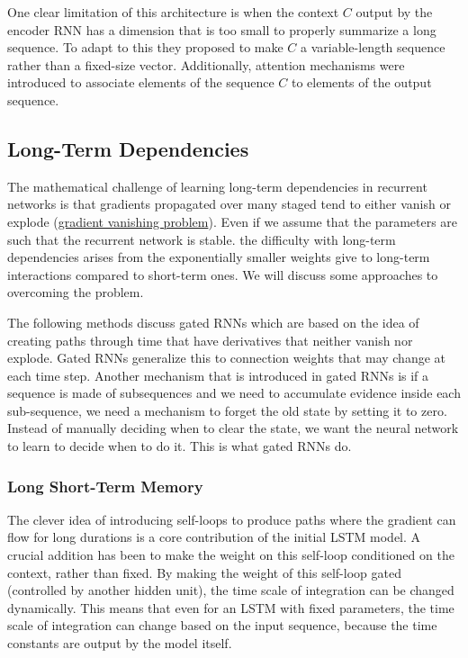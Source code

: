 \documentclass[12pt]{article}
\begin{document}
        One clear limitation of this architecture is when the context $C$ output by the encoder RNN has a dimension that
        is too small to properly summarize a long sequence. To adapt to this they proposed to make $C$ a
        variable-length sequence rather than a fixed-size vector. Additionally, attention mechanisms were introduced to
        associate elements of the sequence $C$ to elements of the output sequence.
    
    \subsection{Long-Term Dependencies}
        The mathematical challenge of learning long-term dependencies in recurrent networks is that gradients propagated
        over many staged tend to either vanish or explode (\hyperref[sec:VanishingProblem]{gradient vanishing problem}).
        Even if we assume that the parameters are such that the recurrent network is stable. the difficulty with
        long-term dependencies arises from the exponentially smaller weights give to long-term interactions compared to
        short-term ones. We will discuss some approaches to overcoming the problem. 
        
        The following methods discuss gated RNNs which are based on the idea of creating paths through time that have
        derivatives that neither vanish nor explode. Gated RNNs generalize this to connection weights that may change at
        each time step. Another mechanism that is introduced in gated RNNs is if a sequence is made of subsequences and
        we need to accumulate evidence inside each sub-sequence, we need a mechanism to forget the old state by setting
        it to zero. Instead of manually deciding when to clear the state, we want the neural network to learn to decide
        when to do it. This is what gated RNNs do. 

        \subsubsection{Long Short-Term Memory} \label{sec:LSTM}
            The clever idea of introducing self-loops to produce paths where the gradient can flow for long durations is
            a core contribution of the initial LSTM model. A crucial addition has been to make the weight on this
            self-loop conditioned on the context, rather than fixed. By making the weight of this self-loop gated
            (controlled by another hidden unit), the time scale of integration can be changed dynamically. This means
            that even for an LSTM with fixed parameters, the time scale of integration can change based on the input
            sequence, because the time constants are output by the model itself. 
\end{document}
